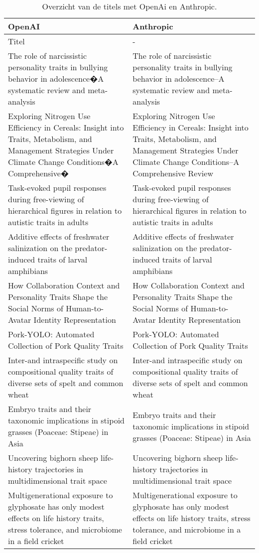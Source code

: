 \begin{table}[h!]
    \caption{Overzicht van de titels met OpenAi en Anthropic.}
    \centering
    \begin{tabularx}{\textwidth}{|X|X|} 
        \hline
        \rowcolor{lightgray}
        OpenAI & Anthropic \\ 
        \hline
        \rowcolor{lightgray}
        Titel & - \\ 
        \hline
        The role of narcissistic personality traits in bullying behavior in adolescence�A systematic review and meta-analysis & The role of narcissistic personality traits in bullying behavior in adolescence–A systematic review and meta-analysis \\ 
        Exploring Nitrogen Use Efficiency in Cereals: Insight into Traits, Metabolism, and Management Strategies Under Climate Change Conditions�A Comprehensive� & Exploring Nitrogen Use Efficiency in Cereals: Insight into Traits, Metabolism, and Management Strategies Under Climate Change Conditions–A Comprehensive Review \\
        Task-evoked pupil responses during free-viewing of hierarchical figures in relation to autistic traits in adults & Task-evoked pupil responses during free-viewing of hierarchical figures in relation to autistic traits in adults \\
        Additive effects of freshwater salinization on the predator-induced traits of larval amphibians & Additive effects of freshwater salinization on the predator-induced traits of larval amphibians \\
        How Collaboration Context and Personality Traits Shape the Social Norms of Human-to-Avatar Identity Representation & How Collaboration Context and Personality Traits Shape the Social Norms of Human-to-Avatar Identity Representation \\
        Pork-YOLO: Automated Collection of Pork Quality Traits & Pork-YOLO: Automated Collection of Pork Quality Traits \\
        Inter-and intraspecific study on compositional quality traits of diverse sets of spelt and common wheat & Inter-and intraspecific study on compositional quality traits of diverse sets of spelt and common wheat \\
        Embryo traits and their taxonomic implications in stipoid grasses (Poaceae: Stipeae) in Asia & Embryo traits and their taxonomic implications in stipoid grasses (Poaceae: Stipeae) in Asia \\
        Uncovering bighorn sheep life-history trajectories in multidimensional trait space & Uncovering bighorn sheep life-history trajectories in multidimensional trait space \\
        Multigenerational exposure to glyphosate has only modest effects on life history traits, stress tolerance, and microbiome in a field cricket & Multigenerational exposure to glyphosate has only modest effects on life history traits, stress tolerance, and microbiome in a field cricket \\
        \hline
    \end{tabularx}
    \label{table:llmTitel}
\end{table}
